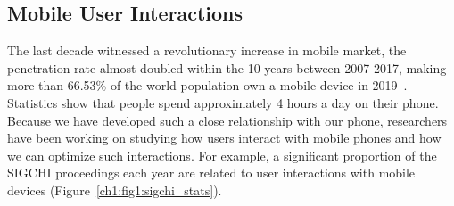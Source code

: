 

\subsection{Mobile User Interactions}

The last decade witnessed a revolutionary increase in mobile market, the penetration rate almost doubled within the 10 years between 2007-2017, making more than 66.53\% of the world population own a mobile device in 2019~\cite{phone_penetration}. Statistics show that people spend approximately 4 hours a day on their phone. Because we have developed such a close relationship with our phone, researchers have been working on studying how users interact with mobile phones and how we can optimize such interactions. For example, a significant proportion of the SIGCHI proceedings each year are related to user interactions with mobile devices (Figure~\ref{ch1:fig1:sigchi_stats}). 

